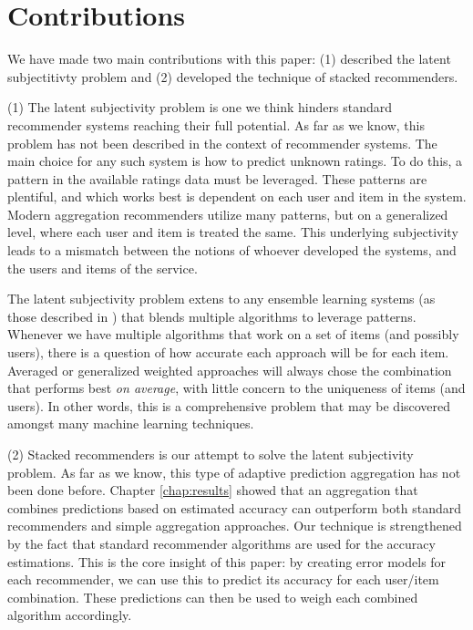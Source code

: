 \section{Contributions} 

We have made two main contributions with this paper:
(1) described the latent subjectitivty problem and
(2) developed the technique of stacked recommenders.

(1) The latent subjectivity problem is one we think hinders
standard recommender systems reaching their full potential.
As far as we know, this problem has not been described
in the context of recommender systems.
The main choice for any such system is how to predict unknown ratings.
To do this, a pattern in the available ratings data must be leveraged.
These patterns are plentiful, and which works best is dependent on
each user and item in the system.
Modern aggregation recommenders utilize many patterns, but on a generalized
level, where each user and item is treated the same.
This underlying subjectivity leads to a mismatch between the notions
of whoever developed the systems, and the users and items of the service.

The latent subjectivity problem extens to any ensemble learning systems
(as those described in \cite{Polikar2006}) that blends multiple 
algorithms to leverage patterns.
Whenever we have multiple algorithms that work on a set of items
(and possibly users), there is a question of how accurate each
approach will be for each item.
Averaged or generalized weighted approaches will always
chose the combination that performs best \emph{on average},
with little concern to the uniqueness of items (and users).
In other words, this is a comprehensive problem
that may be discovered amongst many machine learning techniques.

(2) Stacked recommenders is our attempt to solve the latent subjectivity problem.
As far as we know, this type of adaptive prediction aggregation has not been done before.
Chapter \ref{chap:results} showed that an aggregation that combines predictions based
on estimated accuracy can outperform both standard recommenders and simple aggregation approaches.
Our technique is strengthened by the fact that standard recommender algorithms
are used for the accuracy estimations.
This is the core insight of this paper: 
by creating error models for each recommender, we can use this to predict
its accuracy for each user/item combination.
These predictions can then be used to weigh each combined algorithm accordingly.

